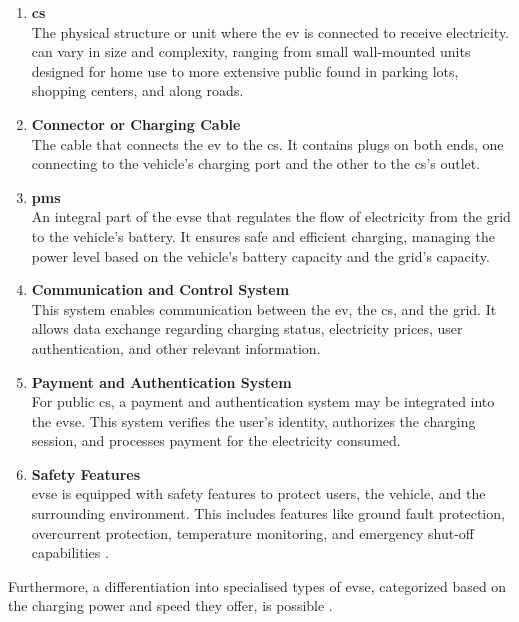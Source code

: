 \begin{enumerate}
    \item \textbf{\acrfull{cs}}\\The physical structure or unit where the \acrshort{ev} is connected to receive electricity.  can vary in size and complexity, ranging from small wall-mounted units designed for home use to more extensive public  found in parking lots, shopping centers, and along roads.
    \item \textbf{Connector or Charging Cable}\\The cable that connects the \acrshort{ev} to the \acrfull{cs}. It contains plugs on both ends, one connecting to the vehicle's charging port and the other to the \acrfull{cs}'s outlet.
    \item \textbf{\acrfull{pms}}\\An integral part of the \acrshort{evse} that regulates the flow of electricity from the grid to the vehicle's battery. It ensures safe and efficient charging, managing the power level based on the vehicle's battery capacity and the grid's capacity.
    \item \textbf{Communication and Control System}\\This system enables communication between the \acrshort{ev}, the \acrfull{cs}, and the grid. It allows data exchange regarding charging status, electricity prices, user authentication, and other relevant information.
    \item \textbf{Payment and Authentication System}\\For public \acrfull{cs}, a payment and authentication system may be integrated into the \acrshort{evse}. This system verifies the user's identity, authorizes the charging session, and processes payment for the electricity consumed.
    \item \textbf{Safety Features}\\ \acrshort{evse} is equipped with safety features to protect users, the vehicle, and the surrounding environment. This includes features like ground fault protection, overcurrent protection, temperature monitoring, and emergency shut-off capabilities \cite{littlefuse_designing_2020}.
\end{enumerate}

Furthermore, a differentiation into specialised types of \acrshort{evse}, categorized based on the charging power and speed they offer, is possible \cite{spendiff-smith_different_2022}.

